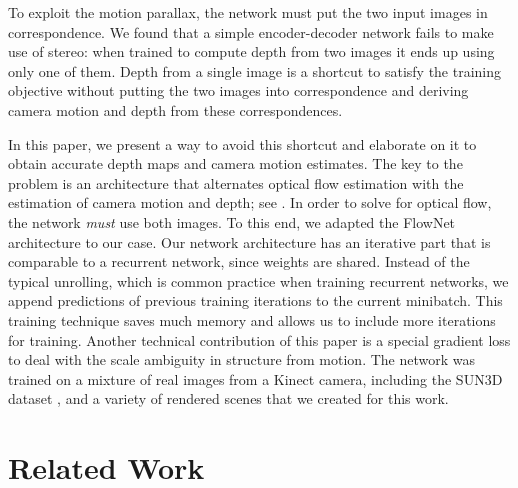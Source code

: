 \documentclass[10pt,twocolumn,letterpaper]{article}
\begin{document}
To exploit the motion parallax, the network must put the two input images in correspondence.
We found that a simple encoder-decoder network fails to make use of stereo: when trained to compute depth from two images it ends up using only one of them.
Depth from a single image is a shortcut to satisfy the training objective
without putting the two images into correspondence and deriving camera motion and depth from these correspondences.

In this paper, we present a way to avoid this shortcut and elaborate on it to obtain accurate depth maps and camera motion estimates. The key to the problem is an architecture that alternates optical flow estimation with the estimation of camera motion and depth; see . 
In order to solve for optical flow, the network \emph{must} use both images. To this end, we adapted the FlowNet architecture \cite{dosovitskiy_flownet_2015} to our case. 
Our network architecture has an iterative part that is comparable to a recurrent network, since weights are shared. 
Instead of the typical unrolling, which is common practice when training recurrent networks, we append predictions of previous training iterations to the current minibatch.
This training technique saves much memory and allows us to include more iterations for training. 
Another technical contribution of this paper is a special gradient loss to deal with the scale ambiguity in structure from motion. The network was trained on a mixture of real images from a Kinect camera, including the SUN3D dataset \cite{xiao_sun3d_2013}, and a variety of rendered scenes that we created for this work.


\section{Related Work}
\end{document}
